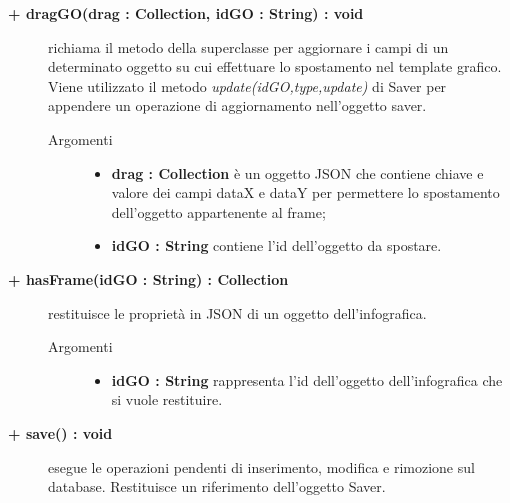 \begin{description}
\begin{description}
\begin{description}
\end{description}

\end{description}

\begin{description}
		\item[\textbf{\color{blue}+ dragGO(drag : Collection, idGO : String) : void			}] \hfill
			richiama il metodo della superclasse per aggiornare i campi di un determinato oggetto su cui effettuare lo spostamento nel template grafico. Viene utilizzato il metodo \textit{update(idGO,type,update)} di Saver per appendere un operazione di aggiornamento nell'oggetto saver.     

\begin{description}
			\item[Argomenti] \hfill
				\begin{itemize}
					\item \textbf{drag : Collection			} \hfill
					è un oggetto JSON che contiene chiave e valore dei campi dataX e dataY per permettere lo spostamento dell'oggetto appartenente al frame;
					\item \textbf{idGO : String			} \hfill
					contiene l'id dell'oggetto da spostare.
				\end{itemize}

\end{description}

\end{description}

\begin{description}
		\item[\textbf{\color{blue}+ hasFrame(idGO : String) : Collection			}] \hfill
			restituisce le proprietà in JSON di un oggetto dell'infografica.     

\begin{description}
			\item[Argomenti] \hfill
				\begin{itemize}
					\item \textbf{idGO : String			} \hfill
					rappresenta l'id dell'oggetto dell'infografica che si vuole restituire. 
				\end{itemize}

\end{description}

\end{description}

\begin{description} 
		\item[\textbf{\color{blue}+ save() : void			}] \hfill
			esegue le operazioni pendenti di inserimento, modifica e rimozione sul database. Restituisce un riferimento dell'oggetto Saver.

\end{description}



\end{description}


